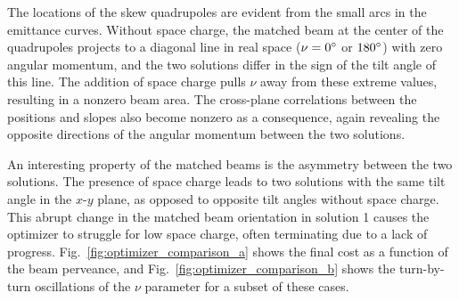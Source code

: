 %
The locations of the skew quadrupoles are evident from the small arcs in the emittance curves. Without space charge, the matched beam at the center of the quadrupoles projects to a diagonal line in real space ($\nu = 0\degree$ or $180\degree$) with zero angular momentum, and the two solutions differ in the sign of the tilt angle of this line. The addition of space charge pulls $\nu$ away from these extreme values, resulting in a nonzero beam area. The cross-plane correlations between the positions and slopes also become nonzero as a consequence, again revealing the opposite directions of the angular momentum between the two solutions. 

An interesting property of the matched beams is the asymmetry between the two solutions. The presence of space charge leads to two solutions with the same tilt angle in the $x$-$y$ plane, as opposed to opposite tilt angles without space charge. This abrupt change in the matched beam orientation in solution 1 causes the optimizer to struggle for low space charge, often terminating due to a lack of progress. Fig.~\ref{fig:optimizer_comparison_a} shows the final cost as a function of the beam perveance, and Fig.~\ref{fig:optimizer_comparison_b} shows the turn-by-turn oscillations of the $\nu$ parameter for a subset of these cases. 
%
